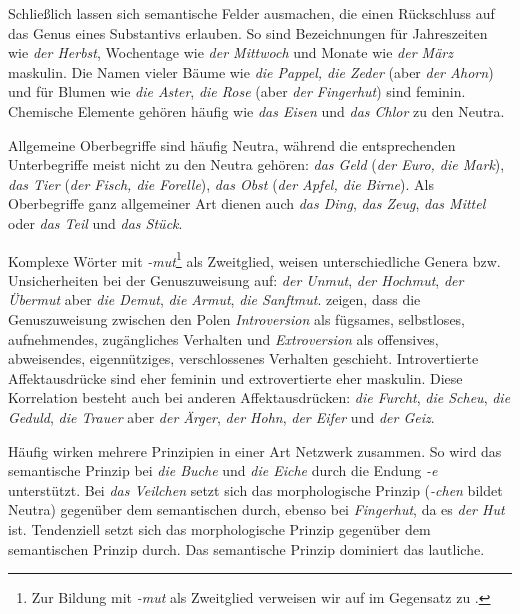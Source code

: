 Schließlich lassen sich semantische Felder ausmachen, die einen Rückschluss auf das Genus eines Substantivs erlauben. So sind \zB Bezeichnungen für Jahreszeiten wie \textit{der Herbst}, Wochentage wie \textit{der Mittwoch} und Monate wie \textit{der März} maskulin. Die Namen vieler Bäume wie \textit{die Pappel, die Zeder} (aber \textit{der Ahorn}) und für Blumen wie \textit{die Aster}, \textit{die Rose} (aber \textit{der Fingerhut}) sind feminin. Chemische Elemente gehören häufig wie \textit{das Eisen} und \textit{das Chlor} zu den Neutra. 

Allgemeine Oberbegriffe sind häufig Neutra, während die entsprechenden Unterbegriffe meist nicht zu den Neutra gehören: \textit{das Geld} (\textit{der Euro, die Mark}), \textit{das Tier} (\textit{der Fisch, die Forelle}), \textit{das Obst} (\textit{der Apfel, die Birne}). Als Oberbegriffe ganz allgemeiner Art dienen auch \textit{das Ding}, \textit{das Zeug}, \textit{das Mittel} oder \textit{das Teil} und \textit{das Stück}.

Komplexe Wörter mit \textit{-mut}\footnote{Zur Bildung mit \textit{-mut} als Zweitglied verweisen wir auf \citet[104--105]{Paul1920Wb} im Gegensatz zu \citet[95]{Erben2006_1975}.} als Zweitglied, weisen unterschiedliche Genera bzw. Unsicherheiten bei der Genuszuweisung auf: \textit{der Unmut}, \textit{der Hochmut}, \textit{der Übermut} aber \textit{die Demut}, \textit{die Armut}, \textit{die Sanftmut}. \citet[38--42]{Koepcke_Zubin1984} zeigen, dass die Genuszuweisung zwischen den Polen \textit{Introversion} als fügsames, selbstloses, aufnehmendes, zugängliches Verhalten und \textit{Extroversion} als offensives, abweisendes, eigennütziges, verschlossenes Verhalten geschieht. Introvertierte Affektausdrücke sind eher feminin und extrovertierte eher maskulin. Diese Korrelation besteht auch bei anderen Affektausdrücken: \textit{die Furcht}, \textit{die Scheu}, \textit{die Geduld}, \textit{die Trauer} aber \textit{der Ärger}, \textit{der Hohn}, \textit{der Eifer} und \textit{der Geiz}.

Häufig wirken mehrere Prinzipien in einer Art Netzwerk zusammen. So wird das semantische Prinzip bei \textit{die Buche} und \textit{die Eiche} durch die Endung \textit{-e} unterstützt. Bei \textit{das Veilchen} setzt sich das morphologische Prinzip (\textit{-chen} bildet Neutra) gegenüber dem semantischen durch, ebenso bei \textit{Fingerhut}, da es \textit{der Hut} ist. Tendenziell setzt sich das morphologische Prinzip gegenüber dem semantischen Prinzip durch. Das semantische Prinzip dominiert das lautliche. 

